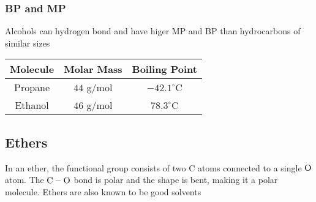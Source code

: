 \documentclass[12pt, a4paper]{article}
\begin{document}
    \begin{center}
    \end{center}

    \subsubsection{BP and MP}

    Alcohols can hydrogen bond and have higer MP and BP than 
    hydrocarbons of similar sizes

    \begin{center}
        \begin{tabular}{ | c | c | c |}
            \hline
            Molecule & Molar Mass & Boiling Point \\
            \hline
            Propane & $44$ g/mol & $-42.1^{\circ}$C \\
            \hline
            Ethanol & $46$ g/mol & $78.3^{\circ}$C \\
            \hline
        \end{tabular}
    \end{center}

    \subsection{Ethers}

    In an ether, the functional group consists of two C atoms connected to a single $\ce{O}$
    atom. The $\ce{C - O}$ bond is polar and the shape is bent, making it a polar molecule. Ethers
    are also known to be good solvents

    \begin{center}
    \end{center}
\end{document}
